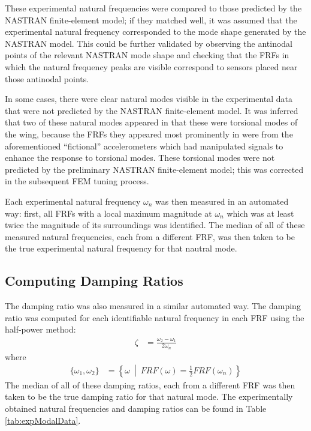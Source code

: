 These experimental natural frequencies were compared to those predicted by the NASTRAN finite-element model; if they matched well, it was assumed that the experimental natural frequency corresponded to the mode shape generated by the NASTRAN model. This could be further validated by observing the antinodal points of the relevant NASTRAN mode shape and checking that the FRFs in which the natural frequency peaks are visible correspond to sensors placed near those antinodal points.

In some cases, there were clear natural modes visible in the experimental data that were not predicted by the NASTRAN finite-element model. It was inferred that two of these natural modes appeared in that these were torsional modes of the wing, because the FRFs they appeared most prominently in were from the aforementioned ``fictional'' accelerometers which had manipulated signals to enhance the response to torsional modes. These torsional modes were not predicted by the preliminary NASTRAN finite-element model; this was corrected in the subsequent FEM tuning process.

Each experimental natural frequency $\omega_n$ was then measured in an automated way: first, all FRFs with a local maximum magnitude at $\omega_n$ which was at least twice the magnitude of its surroundings was identified. The median of all of these measured natural frequencies, each from a different FRF, was then taken to be the true experimental natural frequency for that nautral mode.

\subsection{Computing Damping Ratios}

The damping ratio was also measured in a similar automated way. The damping ratio was computed for each identifiable natural frequency in each FRF using the half-power method:
\begin{align}
	\zeta &= \frac{\omega_2 - \omega_1}{2\omega_n}
\end{align}
where
\begin{align}
	\{\omega_1,\omega_2\} &= \left\{\omega \ \middle| \ FRF(\omega) = \frac{1}{2} FRF(\omega_n)\right\}
\end{align}
The median of all of these damping ratios, each from a different FRF was then taken to be the true damping ratio for that natural mode. The experimentally obtained natural frequencies and damping ratios can be found in Table \ref{tab:expModalData}.


